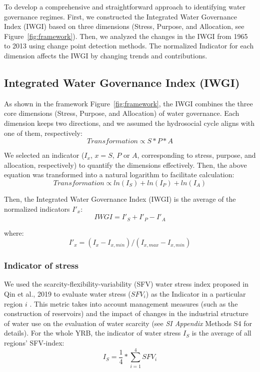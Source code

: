 To develop a comprehensive and straightforward approach to identifying water governance regimes. First, we constructed the Integrated Water Governance Index (IWGI) based on three dimensions (Stress, Purpose, and Allocation, see Figure~\ref{fig:framework}). Then, we analyzed the changes in the IWGI from 1965 to 2013 using change point detection methods. The normalized Indicator for each dimension affects the IWGI by changing trends and contributions.

\subsection{Integrated Water Governance Index (IWGI)}

	As shown in the framework Figure~\ref{fig:framework}, the IWGI combines the three core dimensions (Stress, Purpose, and Allocation) of water governance. Each dimension keeps two directions, and we assumed the hydrosocial cycle aligns with one of them, respectively:
	\begin{equation}
		Transformation \propto S*P*A
	\end{equation}

	We selected an indicator ($I_x$, $x=S$, $P$ or $A$, corresponding to stress, purpose, and allocation, respectively) to quantify the dimensions effectively. Then, the above equation was transformed into a natural logarithm to facilitate calculation:
	\begin{equation}
		Transformation \propto ln(I_S) + ln(I_P) + ln(I_A)
	\end{equation}

	Then, the Integrated Water Governance Index (IWGI) is the average of the normalized indicators $I'_x$:
	\begin{equation}
		IWGI = I'_S + I'_P - I'_A
	\end{equation}

	where:
	\begin{equation}
		I'_x = (I_x - I_{x, min}) / (I_{x, max} - I_{x, min})
	\end{equation}

	\subsubsection*{Indicator of stress}
	We used the scarcity-flexibility-variability (SFV) water stress index proposed in Qin et al., 2019 to evaluate water stress ($SFV_i$) as the Indicator in a particular region $i$ \cite{qin2019}. This metric takes into account management measures (such as the construction of reservoirs) and the impact of changes in the industrial structure of water use on the evaluation of water scarcity (see \textit{SI Appendix} Methods S4 for details). For the whole YRB, the indicator of water stress $I_S$ is the average of all regions' SFV-index:
	\begin{equation}
		I_S = \frac{1}{4} * \sum_{i=1}^4 SFV_{i}
	\end{equation}

